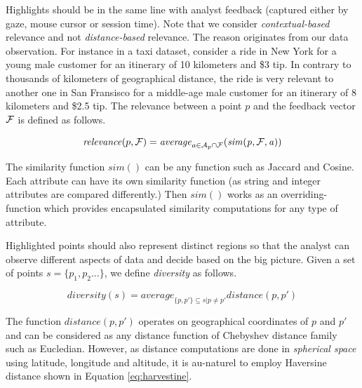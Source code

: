 \documentclass[conference,compsoc]{IEEEtran}
\newtheorem{definition}{Definition}
\begin{document}
\vspace{5pt}
 Highlights should be in the same line with analyst feedback (captured either by gaze, mouse cursor or session time). Note that we consider {\em contextual-based} relevance and not {\em distance-based} relevance. The reason originates from our data observation. For instance in a taxi dataset, consider a ride in New York for a young male customer for an itinerary of 10 kilometers and \$3 tip. In contrary to thousands of kilometers of geographical distance, the ride is very relevant to another one in San Fransisco for a middle-age male customer for an itinerary of 8 kilometers and \$2.5 tip. The relevance between a point $p$ and the feedback vector ${\cal F}$ is defined as follows.


\begin{dmath}
	\label{eq:rel}
	\mathit{relevance}(p,{\cal F}) = \mathit{average}_{a \in {\cal A}_{p} \cap {\cal F}}(\mathit{sim(p, {\cal F}, a)})
\end{dmath}

The similarity function $\mathit{sim}()$ can be any function such as Jaccard and Cosine. Each attribute can have its own similarity function (as string and integer attributes are compared differently.) Then $\mathit{sim}()$ works as an overriding-function which provides encapsulated similarity computations for any type of attribute.

\vspace{5pt}
 Highlighted points should also represent distinct regions so that the analyst can observe different aspects of data and decide based on the big picture. Given a set of points $s = \{ p_1, p_2 \dots \}$, we define {\em diversity} as follows.

\begin{dmath}
	\label{eq:divs}
	\mathit{diversity}(s) = \mathit{average}_{\{p, p'\} \subseteq s | p \neq p' } \mathit{distance}(p,p')
\end{dmath} 

The function $\mathit{distance}(p,p')$ operates on geographical coordinates of $p$ and $p'$ and can be considered as any distance function of Chebyshev distance family such as Eucledian. However, as distance computations are done in {\em spherical space} using latitude, longitude and altitude, it is au-naturel to employ Haversine distance shown in Equation \ref{eq:harvestine}.
\end{document}
